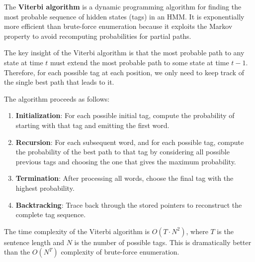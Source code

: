 \documentclass[11pt,a4paper]{article}
\begin{document}
The \textbf{Viterbi algorithm} is a dynamic programming algorithm for finding the most probable sequence of hidden states (tags) in an HMM. It is exponentially more efficient than brute-force enumeration because it exploits the Markov property to avoid recomputing probabilities for partial paths.

The key insight of the Viterbi algorithm is that the most probable path to any state at time $t$ must extend the most probable path to some state at time $t-1$. Therefore, for each possible tag at each position, we only need to keep track of the single best path that leads to it.

The algorithm proceeds as follows:
\begin{enumerate}
    \item \textbf{Initialization}: For each possible initial tag, compute the probability of starting with that tag and emitting the first word.
    \item \textbf{Recursion}: For each subsequent word, and for each possible tag, compute the probability of the best path to that tag by considering all possible previous tags and choosing the one that gives the maximum probability.
    \item \textbf{Termination}: After processing all words, choose the final tag with the highest probability.
    \item \textbf{Backtracking}: Trace back through the stored pointers to reconstruct the complete tag sequence.
\end{enumerate}

The time complexity of the Viterbi algorithm is $O(T \cdot N^2)$, where $T$ is the sentence length and $N$ is the number of possible tags. This is dramatically better than the $O(N^T)$ complexity of brute-force enumeration.
\end{document}
